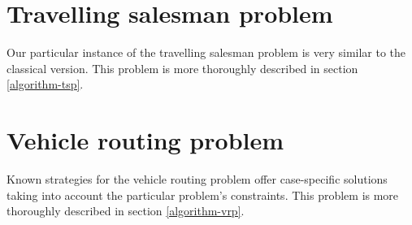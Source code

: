 \section{Travelling salesman problem} \label{problem-decomposition-tsp}
Our particular instance of the travelling salesman problem is very similar to the classical version. This problem is more thoroughly described in section \ref{algorithm-tsp}.
\section{Vehicle routing problem} \label{problem-decomposition-vrp}
Known strategies for the vehicle routing problem offer case-specific solutions taking into account the particular problem's constraints. This problem is more thoroughly described in section \ref{algorithm-vrp}.
